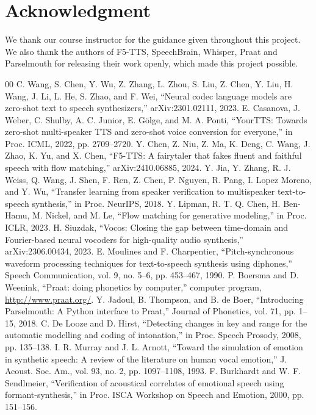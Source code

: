 \documentclass[conference]{IEEEtran}
\begin{document}
\section*{Acknowledgment}
We thank our course instructor for the guidance given throughout this project. We also thank the
authors of F5-TTS, SpeechBrain, Whisper, Praat and Parselmouth for releasing their work openly,
which made this project possible.

\begin{thebibliography}{00}
 C. Wang, S. Chen, Y. Wu, Z. Zhang, L. Zhou, S. Liu, Z. Chen, Y. Liu, H. Wang, J. Li, L. He, S. Zhao, and F. Wei, ``Neural codec language models are zero-shot text to speech synthesizers,'' arXiv:2301.02111, 2023.
 E. Casanova, J. Weber, C. Shulby, A. C. Junior, E. G\"olge, and M. A. Ponti, ``YourTTS: Towards zero-shot multi-speaker TTS and zero-shot voice conversion for everyone,'' in Proc. ICML, 2022, pp. 2709--2720.
 Y. Chen, Z. Niu, Z. Ma, K. Deng, C. Wang, J. Zhao, K. Yu, and X. Chen, ``F5-TTS: A fairytaler that fakes fluent and faithful speech with flow matching,'' arXiv:2410.06885, 2024.
 Y. Jia, Y. Zhang, R. J. Weiss, Q. Wang, J. Shen, F. Ren, Z. Chen, P. Nguyen, R. Pang, I. Lopez Moreno, and Y. Wu, ``Transfer learning from speaker verification to multispeaker text-to-speech synthesis,'' in Proc. NeurIPS, 2018.
 Y. Lipman, R. T. Q. Chen, H. Ben-Hamu, M. Nickel, and M. Le, ``Flow matching for generative modeling,'' in Proc. ICLR, 2023.
 H. Siuzdak, ``Vocos: Closing the gap between time-domain and Fourier-based neural vocoders for high-quality audio synthesis,'' arXiv:2306.00434, 2023.
 E. Moulines and F. Charpentier, ``Pitch-synchronous waveform processing techniques for text-to-speech synthesis using diphones,'' Speech Communication, vol. 9, no. 5--6, pp. 453--467, 1990.
 P. Boersma and D. Weenink, ``Praat: doing phonetics by computer,'' computer program, \url{http://www.praat.org/}.
 Y. Jadoul, B. Thompson, and B. de Boer, ``Introducing Parselmouth: A Python interface to Praat,'' Journal of Phonetics, vol. 71, pp. 1--15, 2018.
 C. De Looze and D. Hirst, ``Detecting changes in key and range for the automatic modelling and coding of intonation,'' in Proc. Speech Prosody, 2008, pp. 135--138.
 I. R. Murray and J. L. Arnott, ``Toward the simulation of emotion in synthetic speech: A review of the literature on human vocal emotion,'' J. Acoust. Soc. Am., vol. 93, no. 2, pp. 1097--1108, 1993.
 F. Burkhardt and W. F. Sendlmeier, ``Verification of acoustical correlates of emotional speech using formant-synthesis,'' in Proc. ISCA Workshop on Speech and Emotion, 2000, pp. 151--156.

\end{thebibliography}
\end{document}
